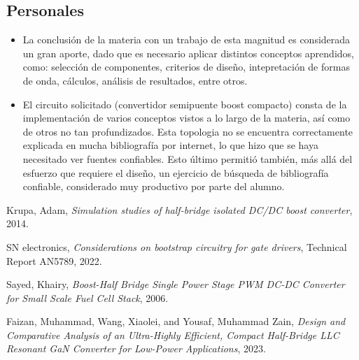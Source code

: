 \subsection{Personales}

\begin{itemize}
	\item La conclusión de la materia con un trabajo de esta magnitud es considerada un gran aporte, dado que es necesario aplicar distintos conceptos aprendidos, como: selección de componentes, criterios de diseño, intepretación de formas de onda, cálculos, análisis de resultados, entre otros.
	\item El circuito solicitado (convertidor semipuente boost compacto) consta de la implementación de varios conceptos vistos a lo largo de la materia, así como de otros no tan profundizados. Esta topologia no se encuentra correctamente explicada en mucha bibliografía por internet, lo que hizo que se haya necesitado ver fuentes confiables. Esto último permitió también, más allá del esfuerzo que requiere el diseño, un ejercicio de búsqueda de bibliografía confiable, considerado muy productivo por parte del alumno.
\end{itemize}


\clearpage
%

\begin{thebibliography}{9}
	
	Krupa, Adam,
	\textit{Simulation studies of half-bridge isolated DC/DC boost converter},
	2014.
	
	SN electronics,
	\textit{Considerations on bootstrap circuitry for gate drivers},
	Technical Report AN5789, 2022.
	
	Sayed, Khairy,
	\textit{Boost-Half Bridge Single Power Stage PWM DC-DC Converter for Small Scale Fuel Cell Stack},
	2006.
	
	Faizan, Muhammad, Wang, Xiaolei, and Yousaf, Muhammad Zain,
	\textit{Design and Comparative Analysis of an Ultra-Highly Efficient, Compact Half-Bridge LLC Resonant GaN Converter for Low-Power Applications},
	2023.
	
\end{thebibliography}

\clearpage



